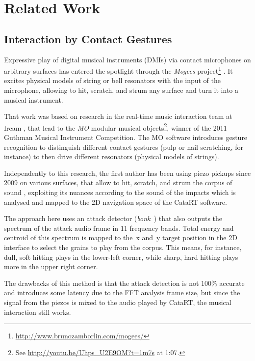 \section{Related Work}\label{sec:related}

\subsection{Interaction by Contact Gestures}

Expressive play of digital musical instruments (DMIs) via contact microphones on arbitrary surfaces has entered the spotlight through the \textit{Mogees} project\footnote{\url{http://www.brunozamborlin.com/mogees/}}  \cite{Zamborlin14a}.  It excites physical models of string or bell resonators with the input of the microphone, allowing to hit, scratch, and strum any surface and turn it into a musical instrument.  

That work was based on research in the real-time music interaction team at Ircam \cite{Rasamimanana11a,Bevilacqua11b}, that lead to the \textit{MO} modular musical objects\footnote{See \url{http://youtu.be/Uhps_U2E9OM?t=1m7s} at 1:07.}, winner of the 2011 Guthman Musical Instrument Competition.
The MO software introduces gesture recognition to distinguish different contact gestures (pulp or nail scratching, for instance) to then drive different resonators (physical models of strings).

Independently to this research, the first author has been using piezo pickups since 2009 on various surfaces, that allow to hit, scratch, and strum the corpus of sound \cite{Schwarz-nime2012-sound-space}, exploiting
its nuances according to the sound of the impacts which is analysed and mapped to
the 2D navigation space of the CataRT software.

The approach here uses an attack detector (\textit{bonk~}) that also outputs the spectrum of the
attack audio frame in 11 frequency bands.  Total energy and centroid of this spectrum is mapped to
the~x and~y target position in the 2D interface to select the grains to play from the corpus.
This means, for instance, dull, soft hitting plays in the lower-left corner, while sharp, hard hitting plays more in the upper right corner.

The drawbacks of this method is that the attack detection is not 100\% accurate and introduces some latency due to the FFT analysis frame size, but since the signal from the piezos is mixed to the
audio played by CataRT, the musical interaction still works.


